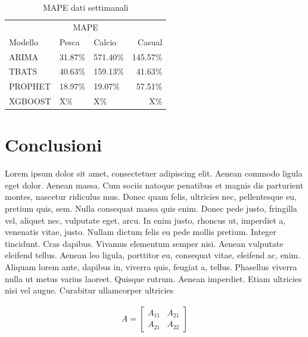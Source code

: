 \documentclass[12pt, a4paper, twocolumn]{article} %
\begin{document}
		\begin{table}[H]
			\caption{MAPE dati settimanali}
			\centering
				\begin{tabular}{lllr}
					\toprule
					\multicolumn{4}{c}{MAPE} \\
					\cmidrule(r){2-4}
						Modello & Pesca & Calcio & Casual \\
					\midrule
						ARIMA & 31.87\% & 571.40\% & 145.57\% \\
						TBATS & 40.63\% & 159.13\% & 41.63\% \\
						PROPHET & 18.97\% & 19.07\% & 57.51\% \\
						XGBOOST & X\% & X\% & X\% \\
					\bottomrule
				\end{tabular}
			\end{table}


\section{Conclusioni}
Lorem ipsum dolor sit amet, consectetuer adipiscing elit. Aenean commodo ligula eget dolor. Aenean massa. Cum sociis natoque penatibus et magnis dis parturient montes, nascetur ridiculus mus. Donec quam felis, ultricies nec, pellentesque eu, pretium quis, sem. Nulla consequat massa quis enim. Donec pede justo, fringilla vel, aliquet nec, vulputate eget, arcu. In enim justo, rhoncus ut, imperdiet a, venenatis vitae, justo. Nullam dictum felis eu pede mollis pretium. Integer tincidunt. Cras dapibus. Vivamus elementum semper nisi. Aenean vulputate eleifend tellus. Aenean leo ligula, porttitor eu, consequat vitae, eleifend ac, enim. Aliquam lorem ante, dapibus in, viverra quis, feugiat a, tellus. Phasellus viverra nulla ut metus varius laoreet. Quisque rutrum. Aenean imperdiet. Etiam ultricies nisi vel augue. Curabitur ullamcorper ultricies

\begin{align}
	A = 
	\begin{bmatrix}
	A_{11} & A_{21} \\
  	A_{21} & A_{22}
	\end{bmatrix}
\end{align}

\nocite{*} %
\printbibliography[title={Bibliografia}] %
\end{document}
